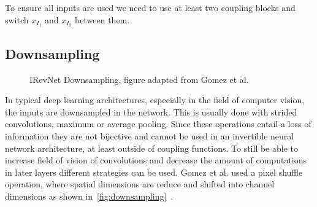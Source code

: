 To ensure all inputs are used we need to use at least two coupling blocks and
switch $x_{I_1}$ and $x_{I_2}$ between them.

\subsection{Downsampling}%
\label{sub:downsampling}

\begin{figure}[htpb]
\begin{center}
\end{center}
\caption{IRevNet Downsampling, figure adapted from Gomez et al.~\citep{gomezReversibleResidualNetwork2017}}%
\label{fig:downsampling}
\end{figure}

In typical deep learning architectures, especially in the field of computer
vision, the inputs are downsampled in the network. This is usually done with
strided convolutions, maximum or average pooling. Since these operations entail
a loss of information they are not bijective and cannot be used in an
invertible neural network architecture, at least outside of coupling functions.
To still be able to increase field of vision of convolutions and decrease the
amount of computations in later layers different strategies can be used. Gomez
et al. used a pixel shuffle operation, where spatial dimensions are reduce and
shifted into channel dimensions as shown
in~\autoref{fig:downsampling}~\citep{gomezReversibleResidualNetwork2017}. 

